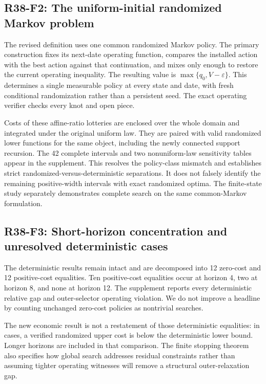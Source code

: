 \subsection{R38-F2: The uniform-initial randomized Markov problem}
The revised definition uses one common randomized Markov policy. The primary construction fixes its next-date operating function, compares the installed action with the best action against that continuation, and mixes only enough to restore the current operating inequality. The resulting value is $\max\{q_0,V-\varepsilon\}$. This determines a single measurable policy at every state and date, with fresh conditional randomization rather than a persistent seed. The exact operating verifier checks every knot and open piece.

Costs of these affine-ratio lotteries are enclosed over the whole domain and integrated under the original uniform law. They are paired with valid randomized lower functions for the same object, including the newly connected support recursion. The 42 complete intervals and two nonuniform-law sensitivity tables appear in the supplement. This resolves the policy-class mismatch and establishes \PrimaryStrict{} strict randomized-versus-deterministic separations. It does not falsely identify the remaining positive-width intervals with exact randomized optima. The finite-state study separately demonstrates complete search on the same common-Markov formulation.

\subsection{R38-F3: Short-horizon concentration and unresolved deterministic cases}
The deterministic results remain intact and are decomposed into 12 zero-cost and 12 positive-cost equalities. Ten positive-cost equalities occur at horizon 4, two at horizon 8, and none at horizon 12. The supplement reports every deterministic relative gap and outer-selector operating violation. We do not improve a headline by counting unchanged zero-cost policies as nontrivial searches.

The new economic result is not a restatement of those deterministic equalities: in \PrimaryStrict{} cases, a verified randomized upper cost is below the deterministic lower bound. Longer horizons are included in that comparison. The finite stopping theorem also specifies how global search addresses residual constraints rather than assuming tighter operating witnesses will remove a structural outer-relaxation gap.

